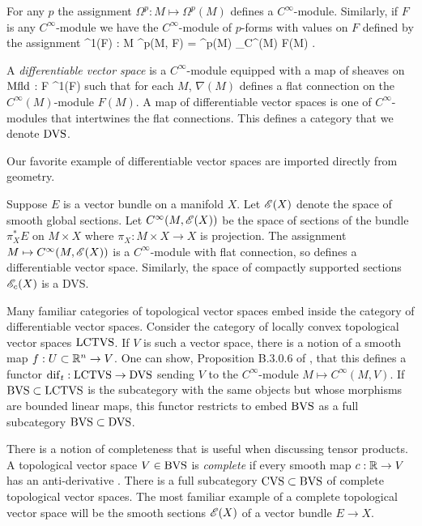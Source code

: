 \documentclass[11pt]{amsart}
\begin{document}
For any $p$ the assignment $\Omega^p : M \mapsto \Omega^p (M)$ defines a $C^\infty$-module.
Similarly, if $F$ is any $C^\infty$-module we have the $C^\infty$-module of $p$-forms with values on $F$ defined by the assignment 
\ben
\Omega^1(F) : M  \mapsto \Omega^p(M, F) = \Omega^p(M) \tensor_{C^\infty(M)} F(M) .
\een

\begin{dfn}
A {\em differentiable vector space} is a $C^\infty$-module equipped with a map of sheaves on ${\rm Mfld}$
\ben
\nabla : F \to \Omega^1(F) 
\een 
such that for each $M$, $\nabla(M)$ defines a flat connection on the $C^\infty(M)$-module $F(M)$. 
A map of differentiable vector spaces is one of $C^\infty$-modules that intertwines the flat connections. 
This defines a category that we denote ${\rm DVS}$.
\end{dfn}

Our favorite example of differentiable vector spaces are imported directly from geometry.

\begin{eg}
Suppose $E$ is a vector bundle on a manifold $X$. 
Let $\mathscr E(X)$ denote the space of smooth global sections.
Let $C^\infty(M, \mathscr E(X))$ be the space of sections of the bundle $\pi_X^*E$ on $M \times X$ where $\pi_X : M \times X \to X$ is projection. 
The assignment $M \mapsto C^\infty(M , \mathscr E(X))$ is a $C^\infty$-module with flat connection, so defines a differentiable vector space.
Similarly, the space of compactly supported sections $\mathscr E_c(X)$ is a DVS. 
\end{eg}

Many familiar categories of topological vector spaces embed inside the category of differentiable vector spaces. 
Consider the category of locally convex topological vector spaces ${\rm LCTVS}$.
If $V$ is such a vector space, there is a notion of a smooth map $f : U \subset \mathbb R^n \to V$.
One can show, Proposition B.3.0.6 of \cite{CG1}, that this defines a functor ${\rm dif}_t : {\rm LCTVS} \to {\rm DVS}$ sending $V$ to the $C^\infty$-module $M \mapsto C^\infty(M, V)$.
If ${\rm BVS} \subset {\rm LCTVS}$ is the subcategory with the same objects but whose morphisms are bounded linear maps, this functor restricts to embed ${\rm BVS}$ as a full subcategory ${\rm BVS} \subset {\rm DVS}$. 

There is a notion of completeness that is useful when discussing tensor products. 
A topological vector space $V \in {\rm BVS}$ is {\em complete} if every smooth map $c : \mathbb R \to V$ has an anti-derivative \cite{KM97}.
There is a full subcategory ${\rm CVS} \subset {\rm BVS}$ of complete topological vector spaces.
The most familiar example of a complete topological vector space will be the smooth sections $\mathscr E(X)$ of a vector bundle $E \to X$.
\end{document}
